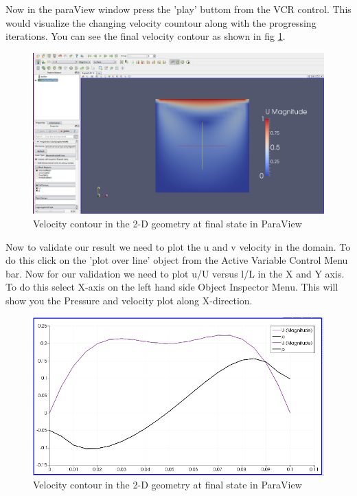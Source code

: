 \documentclass[a4paper,12pt]{report}
\begin{document}
\flushleft Now in the paraView window press the 'play' buttom from the VCR control. This would visualize the changing velocity countour along with the progressing iterations. You can see the final velocity contour as shown in fig \ref{vel2}.

\begin{figure}[ht]  
\begin{center}  
\includegraphics[scale=0.24]{vel2.png}
\caption{Velocity contour in the 2-D geometry at final state in ParaView}
\label{vel2}
\end{center}  
\end{figure}

\flushleft Now to validate our result we need to plot the u and v velocity in the domain. To do this click on the 'plot over line' object from the  Active Variable Control Menu bar. Now for our validation we need to plot u/U versus l/L in the X and Y axis. To do this select X-axis on the left hand side  Object Inspector Menu. This will show you the Pressure and velocity plot along X-direction.

\begin{figure}[ht]  
\begin{center}  
\includegraphics[scale=0.24]{xaxisvel.png}
\caption{Velocity contour in the 2-D geometry at final state in ParaView}
\label{xaxisvel}
\end{center}  
\end{figure}
\end{document}
